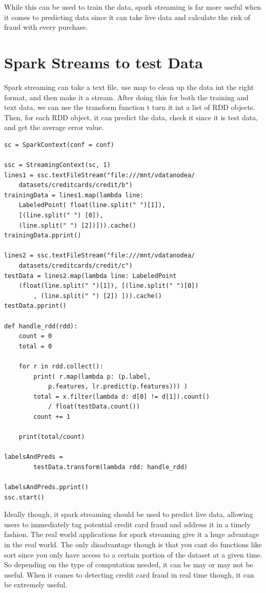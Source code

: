 \documentclass[9pt,twocolumn,twoside]{idsi}
\begin{document}
While this can be used to train the data, spark streaming is far more useful when it comes to predicting data since it can take live data and calculate the risk of fraud with every purchase. 


\section{Spark Streams to test Data}

Spark streaming can take a text file, use map to clean up the data int the right format, and then make it a stream. After doing this for both the training and text data, we can use the transform function t turn it int a list of RDD objects. Then, for each RDD object, it can predict the data, check it since it is test data, and get the average error value.

\begin {verbatim}
sc = SparkContext(conf = conf)

ssc = StreamingContext(sc, 1)
lines1 = ssc.textFileStream("file:///mnt/vdatanodea/
	datasets/creditcards/credit/b")
trainingData = lines1.map(lambda line: 
	LabeledPoint( float(line.split(" ")[1]), 
    [(line.split(" ") [0]),
    (line.split(" ") [2])])).cache()
trainingData.pprint()

lines2 = ssc.textFileStream("file:///mnt/vdatanodea/
	datasets/creditcards/credit/c")
testData = lines2.map(lambda line: LabeledPoint
	(float(line.split(" ")[1]), [(line.split(" ")[0])
    	, (line.split(" ") [2]) ])).cache()
testData.pprint()

def handle_rdd(rdd):
    count = 0
    total = 0
    
    for r in rdd.collect():
        print( r.map(lambda p: (p.label, 
        	p.features, lr.predict(p.features))) )
        total = x.filter(lambda d: d[0] != d[1]).count()
        	/ float(testData.count())
        count += 1
        
    print(total/count)
    
labelsAndPreds = 
		testData.transform(lambda rdd: handle_rdd)

labelsAndPreds.pprint()
ssc.start() 
\end{verbatim}

Ideally though, it spark streaming should be used to predict live data, allowing users to immediately tag potential credit card fraud and address it in a timely fashion. The real world applications for spark streaming give it a huge advantage in the real world. The only disadvantage though is that you cant do functions like sort since you only have access to a certain portion of the dataset at a given time. So depending on the type of computation needed, it can be may or may not be useful. When it comes to detecting credit card fraud in real time though, it can be extremely useful.  
\end{document}
